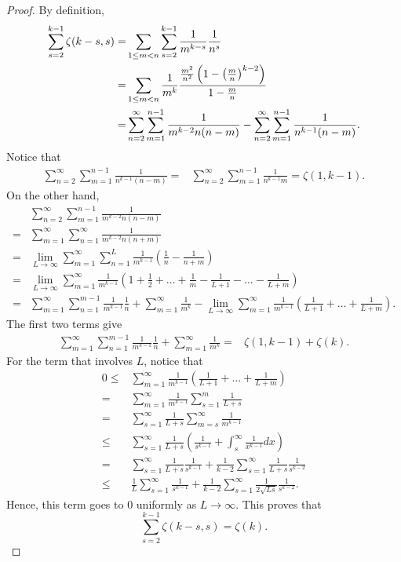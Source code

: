 \documentclass[reqno]{amsart}
\theoremstyle{definition}
\theoremstyle{remark}
\numberwithin{equation}{section}
\begin{document}
\begin{proof}
By definition,
\begin{align*}
\sum_{s=2}^{k-1}\zeta(k-s, s)=&\sum_{1\leq m<n}\sum_{s=2}^{k-1}\frac{1}{m^{k-s}}\frac{1}{n^s}\\
=&\sum_{1\leq m<n} \frac{1}{m^{k}}\frac{{\displaystyle} \frac{m^2}{n^2}\left(1-\left(\frac{m}{n}\right)^{k-2}\right)}{{\displaystyle} 1-\frac{m}{n}}\\
=&\sum_{n=2}^{\infty}\sum_{m=1}^{n-1} \frac{1}{m^{k-2}n(n-m)}-\sum_{n=2}^{\infty}\sum_{m=1}^{n-1}\frac{1}{n^{k-1}(n-m)}.
\end{align*}Notice that
\begin{align*}
\sum_{n=2}^{\infty}\sum_{m=1}^{n-1}\frac{1}{n^{k-1}(n-m)}=&\sum_{n=2}^{\infty}\sum_{m=1}^{n-1}\frac{1}{n^{k-1}m}=\zeta(1, k-1).
\end{align*}On the other hand,
\begin{align*}
&\sum_{n=2}^{\infty}\sum_{m=1}^{n-1}\frac{1}{m^{k-2}n(n-m)}\\=&\sum_{m=1}^{\infty}\sum_{n=1}^{\infty} \frac{1}{m^{k-2}n(n+m)}\\
=&\lim_{L\rightarrow\infty}\sum_{m=1}^{\infty}\sum_{n=1}^L\frac{1}{m^{k-1}}\left(\frac{1}{n}-\frac{1}{n+m}\right)\\
=&\lim_{L\rightarrow\infty}\sum_{m=1}^{\infty} \frac{1}{m^{k-1}}\left(1+\frac{1}{2}+\ldots+\frac{1}{m}-\frac{1}{L+1}-\ldots-\frac{1}{L+m}\right)\\
=&\sum_{m=1}^{\infty} \sum_{n=1}^{m-1}\frac{1}{m^{k-1}}\frac{1}{n}+\sum_{m=1}^{\infty} \frac{1}{m^{k}}-\lim_{L\rightarrow\infty}\sum_{m=1}^{\infty} \frac{1}{m^{k-1}}\left( \frac{1}{L+1}+\ldots+\frac{1}{L+m}\right).
\end{align*}
The first two terms give
\begin{align*}
\sum_{m=1}^{\infty} \sum_{n=1}^{m-1}\frac{1}{m^{k-1}}\frac{1}{n}+\sum_{m=1}^{\infty} \frac{1}{m^{k}}=&\zeta(1, k-1)+\zeta(k).
\end{align*}
For the term that involves $L$, notice that
\begin{align*}
0\leq & \sum_{m=1}^{\infty} \frac{1}{m^{k-1}}\left( \frac{1}{L+1}+\ldots+\frac{1}{L+m}\right) \\
=&  \sum_{m=1}^{\infty} \frac{1}{m^{k-1}}\sum_{s=1}^m\frac{1}{L+s} \\
=& \sum_{s=1}^{\infty}\frac{1}{L+s}\sum_{m=s}^{\infty}\frac{1}{m^{k-1}} \\
 \leq  & \sum_{s=1}^{\infty}\frac{1}{L+s}\left(\frac{1}{s^{k-1}}+\int_{s}^{\infty}\frac{1}{x^{k-1}}dx\right)\\
 =&\sum_{s=1}^{\infty}\frac{1}{L+s} \frac{1}{s^{k-1}}+\frac{1}{k-2}\sum_{s=1}^{\infty}\frac{1}{L+s} \frac{1}{s^{k-2}}\\
\leq & \frac{1}{L}\sum_{s=1}^{\infty} \frac{1}{s^{k-1}}+\frac{1}{k-2}\sum_{s=1}^{\infty}\frac{1}{2\sqrt{Ls}} \frac{1}{s^{k-2}}.
\end{align*}
Hence, this term goes to 0 uniformly as $L\rightarrow\infty$.
 This proves that
 $$\sum_{s=2}^{k-1}\zeta(k-s, s)=\zeta(k).$$


\end{proof}
\end{document}
